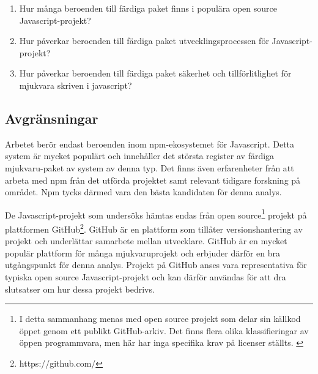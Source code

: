 \begin{enumerate}
\item\label{joel_o-fs:1} Hur många beroenden till färdiga paket finns i populära open source Javascript-projekt?

\item\label{joel_o-fs:2} Hur påverkar beroenden till färdiga paket utvecklingsprocessen för Javascript-projekt?

\item\label{joel_o-fs:3} Hur påverkar beroenden till färdiga paket säkerhet och tillförlitlighet för mjukvara skriven i javascript?
\end{enumerate}

\subsection{Avgränsningar}
\label{subsec:joel_o-delimitations}
Arbetet berör endast beroenden inom npm-ekosystemet för Javascript. Detta system är mycket populärt och innehåller det största register av färdiga mjukvaru-paket av system av denna typ.\cite{Decan2018} Det finns även erfarenheter från att arbeta med npm från det utförda projektet samt relevant tidigare forskning på området. Npm tycks därmed vara den bästa kandidaten för denna analys.

De Javascript-projekt som undersöks hämtas endas från open source\footnote{I detta sammanhang menas med open source projekt som delar sin källkod öppet genom ett publikt GitHub-arkiv. Det finns flera olika klassifieringar av öppen programmvara, men här har inga specifika krav på licenser ställts. \cite{what-is-open-source}} projekt på plattformen GitHub\footnote{https://github.com/}. GitHub är en plattform som tillåter versionshantering av projekt och underlättar samarbete mellan utvecklare. GitHub är en mycket populär plattform för många mjukvaruprojekt och erbjuder därför en bra utgångspunkt för denna analys. Projekt på GitHub anses vara representativa för typiska open source Javascript-projekt och kan därför användas för att dra slutsatser om hur dessa projekt bedrivs.
